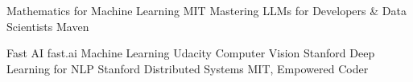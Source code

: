 

\begin{cventries}

  \cventry
    {Mathematics for Machine Learning} %
    {} %
    {} %
    {MIT} %
    {
    }
  \vspace{-1.1em}
  \cventry
    {Mastering LLMs for Developers \& Data Scientists} %
    {} %
    {} %
    {Maven} %
    {}

  \vspace{-1.5em}
    \cventry
    {Fast AI} %
    {} %
    {} %
    {fast.ai} %
    {}
    \vspace{-1em}
    \cventry
    {Machine Learning} %
    {} %
    {} %
    {Udacity} %
    {}
    \vspace{-1em}
    \cventry
    {Computer Vision} %
    {} %
    {} %
    {Stanford} %
    {}
    \vspace{-1em}
    \cventry
    {Deep Learning for NLP} %
    {} %
    {} %
    {Stanford} %
    {}
    \vspace{-1em}
    \cventry
    {Distributed Systems} %
    {} %
    {} %
    {MIT, Empowered Coder} %
    {}
\end{cventries}
